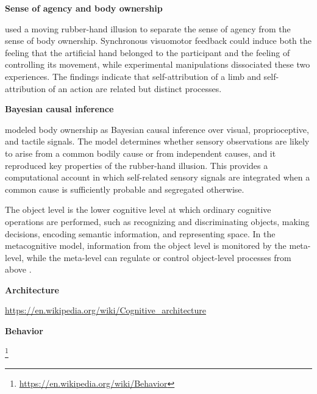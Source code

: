 \documentclass{book}
\providecommand{\ProjectDeepHeading}[2]{%
    \par\medskip\noindent\textbf{#2}\par\smallskip
}
\providecommand{\seeherefooter}[1]{\footnote{\url{#1}}}
\begin{document}
         \ProjectDeepHeading{11}{Sense of agency and body ownership}
            \cite{kalckert-2012-moving-a-rubber-hand-that-feels-like-your-own} used a moving rubber-hand illusion to separate the sense of agency from the sense of body ownership. Synchronous visuomotor feedback could induce both the feeling that the artificial hand belonged to the participant and the feeling of controlling its movement, while experimental manipulations dissociated these two experiences. The findings indicate that self-attribution of a limb and self-attribution of an action are related but distinct processes.

         \ProjectDeepHeading{11}{Bayesian causal inference}
            \cite{samad-2015-perception-of-body-ownership-is-driven-by-bayesian-sensory-inference} modeled body ownership as Bayesian causal inference over visual, proprioceptive, and tactile signals. The model determines whether sensory observations are likely to arise from a common bodily cause or from independent causes, and it reproduced key properties of the rubber-hand illusion. This provides a computational account in which self-related sensory signals are integrated when a common cause is sufficiently probable and segregated otherwise.


The object level is the lower cognitive level at which ordinary cognitive operations are performed, such as recognizing and discriminating objects, making decisions, encoding semantic information, and representing space. In the metacognitive model, information from the object level is monitored by the meta-level, while the meta-level can regulate or control object-level processes from above \cite{fleur-2021-metacognition-ideas-and-insights-from-neuro-and-educational-scie}.

\ProjectDeepHeading{2}{Architecture}


\url{https://en.wikipedia.org/wiki/Cognitive_architecture}

\ProjectDeepHeading{2}{Behavior}


\seeherefooter{https://en.wikipedia.org/wiki/Behavior}
\end{document}
